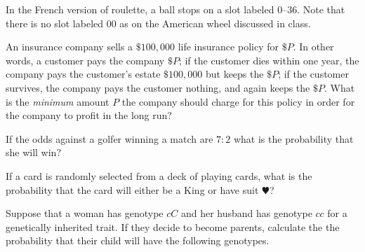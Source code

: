 \documentclass[addpoints,12pt]{exam}
\begin{document}
\begin{questions}

\question[12] In the French version of roulette, a ball stops
on a slot labeled $0$--$36$. Note that there is no slot labeled
$00$ as on the American wheel discussed in class.

\question[12] An insurance company sells a $\$100,000$
life insurance policy for $\$P$. 
In other words, a customer pays the company $\$P$;
if the customer dies within one year, the company
pays the customer's estate $\$100,000$ but keeps the $\$P$;
if the customer survives, the company pays the customer nothing, and again
keeps the $\$P$. What is the {\em minimum} amount $P$ the
company should charge for this policy in order
for the company to profit in the long run?

\question[8] If the odds against a golfer winning a match
are $7:2$ what is the probability that she will win?

\question[10] If a card is randomly selected from a deck
of playing cards, what is the probability that the card
will either be a King or have suit $\varheart$?

\question[12]
Suppose that a woman has genotype $cC$
and her husband has genotype $cc$ for a
genetically inherited trait.
If they decide to become parents, calculate the
the probability that their child will
have the following genotypes.
\end{questions}
\end{document}
